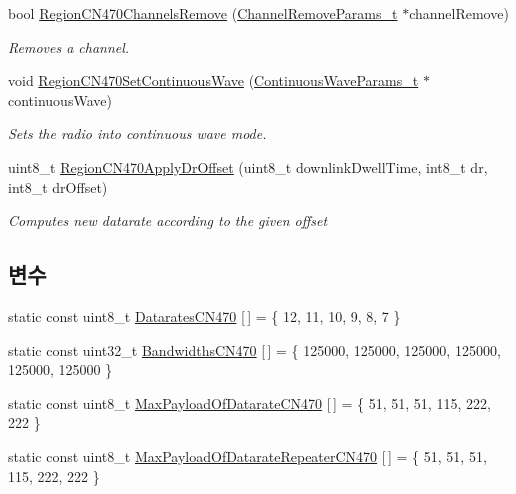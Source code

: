 \begin{DoxyCompactItemize}
bool \mbox{\hyperlink{group___r_e_g_i_o_n_c_n470_ga325aac904d27927672021106fc718f09}{Region\+C\+N470\+Channels\+Remove}} (\mbox{\hyperlink{group___r_e_g_i_o_n_gaa37468560d2fc81a977b57a48e5d72c0}{Channel\+Remove\+Params\+\_\+t}} $\ast$channel\+Remove)
\begin{DoxyCompactList}\small\item\em Removes a channel. \end{DoxyCompactList}\item 
void \mbox{\hyperlink{group___r_e_g_i_o_n_c_n470_ga0a1e509012a913631470e9801cc972bd}{Region\+C\+N470\+Set\+Continuous\+Wave}} (\mbox{\hyperlink{group___r_e_g_i_o_n_gaf39bb5ba06921139c6d17f88a8d518cd}{Continuous\+Wave\+Params\+\_\+t}} $\ast$continuous\+Wave)
\begin{DoxyCompactList}\small\item\em Sets the radio into continuous wave mode. \end{DoxyCompactList}\item 
uint8\+\_\+t \mbox{\hyperlink{group___r_e_g_i_o_n_c_n470_ga9b7086c4eb616fb332a95f05845aac89}{Region\+C\+N470\+Apply\+Dr\+Offset}} (uint8\+\_\+t downlink\+Dwell\+Time, int8\+\_\+t dr, int8\+\_\+t dr\+Offset)
\begin{DoxyCompactList}\small\item\em Computes new datarate according to the given offset \end{DoxyCompactList}\end{DoxyCompactItemize}
\subsection*{변수}
\begin{DoxyCompactItemize}
\item 
static const uint8\+\_\+t \mbox{\hyperlink{group___r_e_g_i_o_n_c_n470_gad0ff6edccf59c2eaf0e6f35a46d62a05}{Datarates\+C\+N470}} \mbox{[}$\,$\mbox{]} = \{ 12, 11, 10, 9, 8, 7 \}
\item 
static const uint32\+\_\+t \mbox{\hyperlink{group___r_e_g_i_o_n_c_n470_gae2b304c90af11277c46253a9fc934b98}{Bandwidths\+C\+N470}} \mbox{[}$\,$\mbox{]} = \{ 125000, 125000, 125000, 125000, 125000, 125000 \}
\item 
static const uint8\+\_\+t \mbox{\hyperlink{group___r_e_g_i_o_n_c_n470_gabe561c63689717791704a2c3c428403b}{Max\+Payload\+Of\+Datarate\+C\+N470}} \mbox{[}$\,$\mbox{]} = \{ 51, 51, 51, 115, 222, 222 \}
\item 
static const uint8\+\_\+t \mbox{\hyperlink{group___r_e_g_i_o_n_c_n470_gade3666273b2cd234202b56bc4dd2e599}{Max\+Payload\+Of\+Datarate\+Repeater\+C\+N470}} \mbox{[}$\,$\mbox{]} = \{ 51, 51, 51, 115, 222, 222 \}
\end{DoxyCompactItemize}



